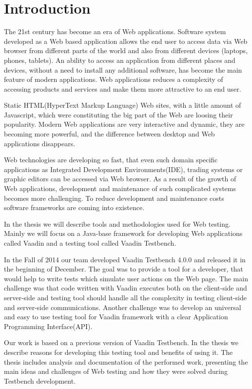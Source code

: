 	
	 \chapter{Introduction}
	 \label{ch:intro} 		
	The 21st century has become an era of Web applications. Software system
	developed as a Web based application allows the end user to access data via
	Web browser from different parts of the world and also from different devices
	(laptops, phones, tablets). An ability to access an application from different
	places and devices, without a need to install any additional software,
	has become the main feature of modern applications. Web applications reduces a
	complexity of accessing products and services and make them more attractive to an end
	user.
	
	Static HTML(HyperText Markup Language) Web sites, with a little amount of
	Javascript, which were constituting the big part of the Web are loosing their popularity.
	Modern Web	applications are very interactive and dynamic, they are becoming
	more powerful, and the difference between desktop and Web applications
	disappears. 
	
	Web technologies are developing so fast, that even such domain
	specific applications as Integrated Development Environments(IDE), trading
	systems or graphic editors can be accessed via Web browser. As a result of the
	growth of Web applications, development and maintenance of such complicated
	systems becomes more challenging. To reduce development and maintenance costs
	software frameworks are coming into existence.
	
	In the thesis we will describe tools and methodologies used for Web testing.
	Mainly we will focus on a Java-base framework for developing Web applications
	called Vaadin and a testing tool called Vaadin Testbench.
	
	 In the Fall of 2014 our team developed Vaadin Testbench
	 4.0.0 and released it in the beginning of December. The goal was to provide a
	 tool for a developer, that would help to write tests which simulate user
	 actions on the Web page. The main challenge was that code written with Vaadin
	 executes both on the client-side and server-side and testing tool should handle all the complexity
	 in testing client-side and server-side communications. Another challenge was
	 to develop an universal and easy to use testing tool for Vaadin framework with a
	 clear Application Programming Interface(API).
	 
	 Our work is based on a previous version of Vaadin Testbench. In the thesis
	 we describe reasons for developing this testing tool and benefits of using it.
	 The thesis includes analysis and documentation of the performed work,
	 presenting the main ideas and challenges of Web testing and how they were
	 solved during Testbench development.
	 
